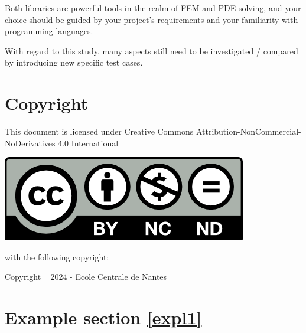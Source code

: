 \documentclass[12pt]{article}
\begin{document}
\bigskip
Both libraries are powerful tools in the realm of FEM and PDE solving, and your choice should be guided by your project's requirements and your familiarity with programming languages.

With regard to this study, many aspects still need to be investigated / compared by introducing new specific test cases.



\clearpage
\section*{Copyright}
This document is licensed under Creative Commons Attribution-NonCommercial-NoDerivatives 4.0 International

\bigskip
\includegraphics{doc.data/img/cc-by-nc-nd.png}

\noindent with the following copyright:

Copyright \textcopyright ~ 2024 - Ecole Centrale de Nantes
\appendix
\section{Example section \ref{expl1}}
\clearpage
\end{document}
